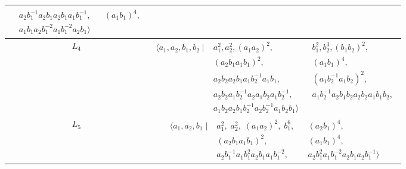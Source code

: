 \documentclass[dvipsnames]{article}
\theoremstyle{definition}
\theoremstyle{remark}
\begin{document}
\begin{longtable}{ |c|c| }
\begin{minipage}{6cm}
{\begin{align*}
            & a_2 b_1^{-1} a_2 b_1 a_2 b_1 a_1 b_1^{-1},
            && (a_1 b_1)^4,\\
            & a_1 b_1 a_2 b_1^{-2} a_1 b_1^{-2} a_2 b_1
            \big \rangle
        \end{align*}
        \vspace{-5mm}
        }
    \end{minipage}\\
    \hline
    $L_4$
    &
    \begin{minipage}{6cm}
        {
        \vspace{-2.5mm}
        \begin{align*}
            \big \langle
            a_1, a_2, b_1, b_2
            \; \big | \;
            &
            a_1^2,
            a_2^2,
            (a_1 a_2)^2,
            && b_1^2,
            b_2^3,
            (b_1 b_2)^2,\\
            & (a_2 b_1 a_1 b_1)^2,
            && (a_1 b_1)^4,\\
            & a_2 b_2 a_2 b_1 a_1 b_2^{-1} a_1 b_1,
            && (a_1 b_2^{-1} a_1 b_2)^2, \\
            & a_2 b_2 a_1 b_2^{-1} a_2 a_1 b_2 a_1 b_2^{-1}, 
            && a_1 b_2^{-1} a_2 b_1 b_2 a_2 b_2 a_1 b_1 b_2, \\
            & a_1 b_2 a_2 b_1 b_2^{-1} a_2 b_2^{-1} a_1 b_2 b_1
            \big \rangle
        \end{align*}
        \vspace{-5mm}
        }
    \end{minipage}\\
    \hline
    $L_5$ 
    &
    \begin{minipage}{6cm}
        {
        \vspace{-2.5mm}
        \begin{align*}
            \big \langle
            a_1, a_2, b_1
            \; \big | \;
            &
            a_1^2, \;
            a_2^2, \; 
            (a_1 a_2)^2, \;
            b_1^6,
            && (a_2 b_1)^4, \\
            & (a_2 b_1 a_1 b_1)^2,
            && (a_1 b_1)^4,\\
            & a_2 b_1^{-1} a_1 b_1^2 a_2 b_1 a_1 b_1^{-2},
            && a_2 b_1^2 a_1 b_1^{-2} a_2 b_1 a_2 b_1^{-1}
            \big \rangle
        \end{align*}
        \vspace{-5mm}
        }
    \end{minipage}\\

\end{longtable}
\end{document}
